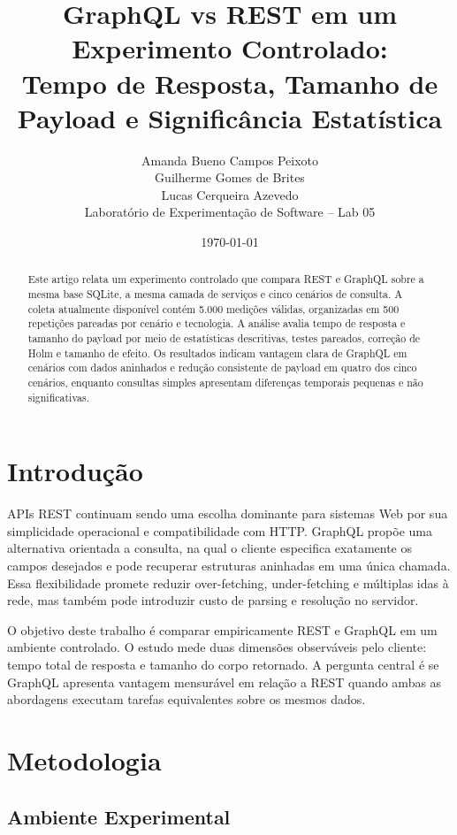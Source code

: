 \documentclass[journal]{IEEEtran}
\title{GraphQL vs REST em um Experimento Controlado:\\
Tempo de Resposta, Tamanho de Payload e Significância Estatística}
\author{Amanda Bueno Campos Peixoto\\
Guilherme Gomes de Brites\\
Lucas Cerqueira Azevedo\\[0.35em]
\small Laboratório de Experimentação de Software -- Lab 05}
\date{\today}
\begin{document}
\maketitle

\begin{abstract}
Este artigo relata um experimento controlado que compara REST e GraphQL sobre a mesma base SQLite, a mesma camada de serviços e cinco cenários de consulta. A coleta atualmente disponível contém 5.000 medições válidas, organizadas em 500 repetições pareadas por cenário e tecnologia. A análise avalia tempo de resposta e tamanho do payload por meio de estatísticas descritivas, testes pareados, correção de Holm e tamanho de efeito. Os resultados indicam vantagem clara de GraphQL em cenários com dados aninhados e redução consistente de payload em quatro dos cinco cenários, enquanto consultas simples apresentam diferenças temporais pequenas e não significativas.
\end{abstract}

\section{Introdução}
\label{sec:intro}

APIs REST continuam sendo uma escolha dominante para sistemas Web por sua simplicidade operacional e compatibilidade com HTTP. GraphQL propõe uma alternativa orientada a consulta, na qual o cliente especifica exatamente os campos desejados e pode recuperar estruturas aninhadas em uma única chamada. Essa flexibilidade promete reduzir over-fetching, under-fetching e múltiplas idas à rede, mas também pode introduzir custo de parsing e resolução no servidor.

O objetivo deste trabalho é comparar empiricamente REST e GraphQL em um ambiente controlado. O estudo mede duas dimensões observáveis pelo cliente: tempo total de resposta e tamanho do corpo retornado. A pergunta central é se GraphQL apresenta vantagem mensurável em relação a REST quando ambas as abordagens executam tarefas equivalentes sobre os mesmos dados.

\section{Metodologia}
\label{sec:methodology}

\subsection{Ambiente Experimental}
\end{document}
